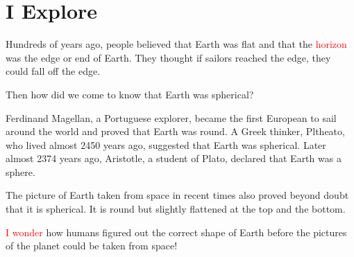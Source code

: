 \section{I Explore}
Hundreds of years ago, people believed that Earth was flat and that the \textcolor{red}{horizon} was the edge or end of Earth. They thought if sailors reached the edge, they could fall off the edge.
\vspace{0.1in}
\par
Then how did we come to know that Earth was spherical?
\vspace{0.1in}
\par
Ferdinand Magellan, a Portuguese explorer, became the first European to sail around the world and proved that Earth was round. A Greek thinker, Pltheato, who lived almost 2450 years ago, suggested that Earth was spherical. Later almost 2374 years ago, Aristotle, a student of Plato, declared that Earth was a sphere.
\vspace{0.6in}
\par
The picture of Earth taken from space in recent times also proved beyond doubt that it is spherical. It is round but slightly flattened at the top and the bottom.
\vspace{0.1in}
\par
\textcolor{red}{I wonder} how humans figured out the correct shape of Earth before the pictures of the planet could be taken from space!
\vspace{0.6in}
